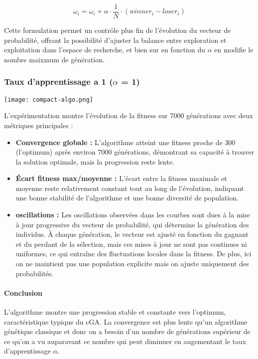 \documentclass{article}
\begin{document}
\[
    \omega_i = \omega_i + \alpha \cdot \frac{1}{N} \cdot (winner_i - loser_i)
\]

Cette formulation permet un contrôle plus fin de l'évolution du vecteur de probabilité, offrant la possibilité d'ajuster la balance entre exploration et exploitation dans l'espace de recherche, et bien sur en fonction du $\alpha$ en modifie le nombre maixmum de génération.

\subsubsection{Taux d'apprentissage a 1 ($\alpha$ = 1)}
\texttt{[image: compact-algo.png]}

L'expérimentation montre l'évolution de la fitness sur 7000 générations avec deux métriques principales :

\begin{itemize}
    \item \textbf{Convergence globale :} L'algorithme atteint une fitness proche de 300 (l'optimum) après environ 7000 générations, démontrant sa capacité à trouver la solution optimale, mais la progression reste lente.

    \item \textbf{Écart fitness max/moyenne :} L'écart entre la fitness maximale et moyenne reste relativement constant tout au long de l'évolution, indiquant une bonne stabilité de l'algorithme et une bonne diversité de population.

    \item \textbf{oscillations :} Les oscillations observées dans les courbes sont dues à la mise à jour progressive du vecteur de probabilité, qui détermine la génération des individus. À chaque génération, le vecteur est ajusté en fonction du gagnant et du perdant de la sélection, mais ces mises à jour ne sont pas continues ni uniformes, ce qui entraîne des fluctuations locales dans la fitness. De plus, ici on ne maintient pas une population explicite mais on ajuste uniquement des probabilités.
\end{itemize}

\paragraph{Conclusion} L'algorithme montre une progression stable et constante vers l'optimum, caractéristique typique du cGA. La convergence est plus lente qu'un algorithme génétique classique et donc on a besoin d'un nombre de générations supérieur de ce qu'on a vu auparavant ce nombre qui peut diminuer en augementant le taux d'apprentissage $\alpha$.
\end{document}
